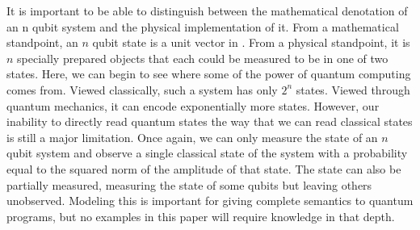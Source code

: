 It is important to be able to distinguish between the mathematical denotation of an n qubit system and the physical implementation of it.
From a mathematical standpoint, an $n$ qubit state is a unit vector in .
From a physical standpoint, it is $n$ specially prepared objects that each could be measured to be in one of two states.
Here, we can begin to see where some of the power of quantum computing comes from.
Viewed classically, such a system has only $2^n$ states.
Viewed through quantum mechanics, it can encode exponentially more states.
However, our inability to directly read quantum states the way that we can read classical states is still a major limitation.
Once again, we can only measure the state of an $n$ qubit system and observe a single classical state of the system with a probability equal to the squared norm of the amplitude of that state. The state can also be partially measured, measuring the state of some qubits but leaving others unobserved.
Modeling this is important for giving complete semantics to quantum programs, but no examples in this paper will require knowledge in that depth. 

